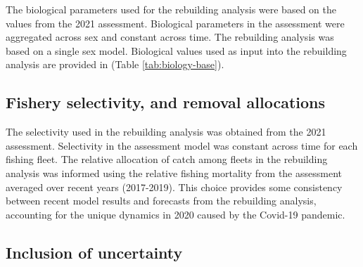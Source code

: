 \documentclass[11pt,
  english,
  a4paper,
]{article}
\begin{document}
\leavevmode\tagmcend\tagstructend


The biological parameters used for the rebuilding analysis were based on the values from the 2021 assessment. Biological parameters in the assessment were aggregated across sex and constant across time. The rebuilding analysis was based on a single sex model. Biological values used as input into the rebuilding analysis are provided in (Table \ref{tab:biology-base}).

\leavevmode\tagmcend\tagstructend\par


\hypertarget{fishery-selectivity-and-removal-allocations}{%
\subsection{Fishery selectivity, and removal allocations}\label{fishery-selectivity-and-removal-allocations}}

\leavevmode\tagmcend\tagstructend


The selectivity used in the rebuilding analysis was obtained from the 2021 assessment. Selectivity in the assessment model was constant across time for each fishing fleet. The relative allocation of catch among fleets in the rebuilding analysis was informed using the relative fishing mortality from the assessment averaged over recent years (2017-2019). This choice provides some consistency between recent model results and forecasts from the rebuilding analysis, accounting for the unique dynamics in 2020 caused by the Covid-19 pandemic.

\leavevmode\tagmcend\tagstructend\par


\hypertarget{inclusion-of-uncertainty}{%
\subsection{Inclusion of uncertainty}\label{inclusion-of-uncertainty}}

\leavevmode\tagmcend\tagstructend

\end{document}
